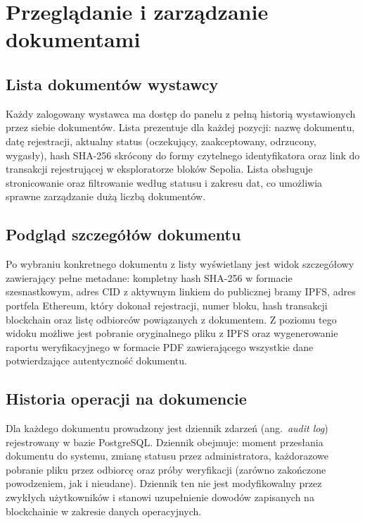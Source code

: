 \documentclass[12pt,a4paper,twoside]{report}
\begin{document}
\newpage
\section{Przeglądanie i zarządzanie dokumentami}

\subsection{Lista dokumentów wystawcy}

Każdy zalogowany wystawca ma dostęp do panelu z pełną historią wystawionych przez siebie
dokumentów. Lista prezentuje dla każdej pozycji: nazwę dokumentu, datę rejestracji,
aktualny status (oczekujący, zaakceptowany, odrzucony, wygasły), hash SHA-256 skrócony
do formy czytelnego identyfikatora oraz link do transakcji rejestrującej w eksploratorze
bloków Sepolia. Lista obsługuje stronicowanie oraz filtrowanie według statusu i zakresu
dat, co umożliwia sprawne zarządzanie dużą liczbą dokumentów.

\subsection{Podgląd szczegółów dokumentu}

Po wybraniu konkretnego dokumentu z listy wyświetlany jest widok szczegółowy zawierający
pełne metadane: kompletny hash SHA-256 w formacie szesnastkowym, adres CID z aktywnym
linkiem do publicznej bramy IPFS, adres portfela Ethereum, który dokonał rejestracji,
numer bloku, hash transakcji blockchain oraz listę odbiorców powiązanych z dokumentem.
Z poziomu tego widoku możliwe jest pobranie oryginalnego pliku z IPFS oraz wygenerowanie
raportu weryfikacyjnego w formacie PDF zawierającego wszystkie dane potwierdzające
autentyczność dokumentu.

\subsection{Historia operacji na dokumencie}

Dla każdego dokumentu prowadzony jest dziennik zdarzeń (ang.~\textit{audit log})
rejestrowany w bazie PostgreSQL. Dziennik obejmuje: moment przesłania dokumentu do
systemu, zmianę statusu przez administratora, każdorazowe pobranie pliku przez odbiorcę
oraz próby weryfikacji (zarówno zakończone powodzeniem, jak i nieudane). Dziennik ten
nie jest modyfikowalny przez zwykłych użytkowników i stanowi uzupełnienie dowodów
zapisanych na blockchainie w zakresie danych operacyjnych.
\end{document}
